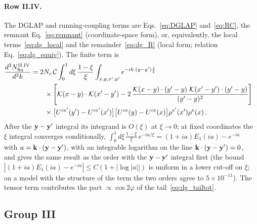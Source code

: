 \paragraph{Row II.IV.} The DGLAP and running-coupling terms are Eqs.~\eqref{eq:DGLAP} and~\eqref{eq:RC}, the remnant Eq.~\eqref{eq:remnant} (coordinate-space form), or, equivalently, the local terms~\eqref{eq:dg_local} and the remainder~\eqref{eq:dg_R} (local form; relation Eq.~\eqref{eq:dg_equiv}). The finite term is
\begin{align}\label{eq:app_IVfin}
\frac{d^3N^{\rm II.IV}_{\rm fin}}{d^3k}&=2N_c\,\mathcal C\int_0^1d\xi\,\frac{1-\xi}{\xi}\int_{x,y,x',y'}e^{-ik\cdot(y-y')\frac1\xi}\notag\\&\qquad\times\Bigg[\mathcal{K}(x-y)\cdot\mathcal{K}(x'-y')-2\,\frac{\mathcal{K}(x-y)\cdot(y'-y)\;\mathcal{K}(x'-y')\cdot(y'-y)}{(y'-y)^2}\Bigg]\notag\\
&\qquad\times\big[U^{ce'}(y')-U^{ce'}(x')\big]\big[U^{ce}(y)-U^{ce}(x)\big]\rho^{e'}(x')\rho^e(x)\,.
\end{align}
After the $\mathbf{y}-\mathbf{y}'$ integral its integrand is $O(\xi)$ at $\xi\to0$; at fixed coordinates the $\xi$ integral converges conditionally, $\int_0^1d\xi\,\frac{1-\xi}{\xi}\,e^{-ia/\xi}=(1+ia)E_1(ia)-e^{-ia}$ with $a=\mathbf{k}\cdot(\mathbf{y}-\mathbf{y}')$, with an integrable logarithm on the line $\mathbf{k}\cdot(\mathbf{y}-\mathbf{y}')=0$, and gives the same result as the order with the $\mathbf{y}-\mathbf{y}'$ integral first (the bound $|(1+ia)E_1(ia)-e^{-ia}|\le C(1+|\log|a||)$ is uniform in a lower cut-off on $\xi$; on a model with the structure of the term the two orders agree to $5\times10^{-11}$). The tensor term contributes the part $\propto\cos2\varphi$ of the tail~\eqref{eq:dg_tailtot}.

\subsection{Group III}

